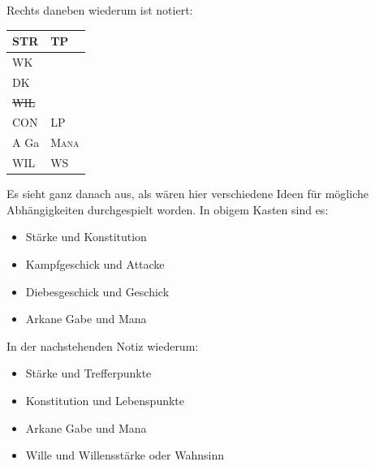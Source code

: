 \documentclass[a5paper,pagesize,numbers=noenddot]{scrbook}
\begin{document}
\vspace{1em}

\vspace{1em}
\noindent Rechts daneben wiederum ist notiert:

\vspace{1em}
\begin{tabular}{ll}
   STR          & TP              \\\hline
   WK           &                 \\
   DK           &                 \\
   \sout{WIL}   &                 \\\cline{1-1}
   CON          & LP              \\
   A Ga         & \textsc{Mana}   \\
   WIL          & WS              \\
\end{tabular}

\vspace{1em}
\noindent Es sieht ganz danach aus, als wären hier verschiedene Ideen für mögliche Abhängigkeiten durchgespielt worden.
In obigem Kasten sind es:

\begin{itemize}
   \item Stärke und Konstitution
   \item Kampfgeschick und Attacke
   \item Diebesgeschick und Geschick
   \item Arkane Gabe und Mana
\end{itemize}

\noindent In der nachstehenden Notiz wiederum:

\begin{itemize}
   \item Stärke und Trefferpunkte
   \item Konstitution und Lebenspunkte
   \item Arkane Gabe und Mana
   \item Wille und Willensstärke oder Wahnsinn %
\end{itemize}
\end{document}
